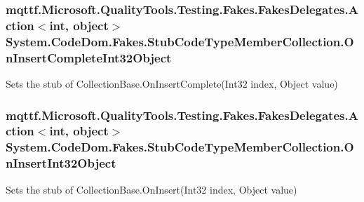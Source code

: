 \hypertarget{class_system_1_1_code_dom_1_1_fakes_1_1_stub_code_type_member_collection_a0ec7a85d0fcd5d9a91e2a6fa99c256ac}{
\subsubsection[{On\-Insert\-Complete\-Int32\-Object}]{\setlength{\rightskip}{0pt plus 5cm}mqttf.\-Microsoft.\-Quality\-Tools.\-Testing.\-Fakes.\-Fakes\-Delegates.\-Action$<$int, object$>$ System.\-Code\-Dom.\-Fakes.\-Stub\-Code\-Type\-Member\-Collection.\-On\-Insert\-Complete\-Int32\-Object}}\label{class_system_1_1_code_dom_1_1_fakes_1_1_stub_code_type_member_collection_a0ec7a85d0fcd5d9a91e2a6fa99c256ac}


Sets the stub of Collection\-Base.\-On\-Insert\-Complete(\-Int32 index, Object value)

\hypertarget{class_system_1_1_code_dom_1_1_fakes_1_1_stub_code_type_member_collection_a8614d203ec76fc0cc17ef7b7db53f347}{
\subsubsection[{On\-Insert\-Int32\-Object}]{\setlength{\rightskip}{0pt plus 5cm}mqttf.\-Microsoft.\-Quality\-Tools.\-Testing.\-Fakes.\-Fakes\-Delegates.\-Action$<$int, object$>$ System.\-Code\-Dom.\-Fakes.\-Stub\-Code\-Type\-Member\-Collection.\-On\-Insert\-Int32\-Object}}\label{class_system_1_1_code_dom_1_1_fakes_1_1_stub_code_type_member_collection_a8614d203ec76fc0cc17ef7b7db53f347}


Sets the stub of Collection\-Base.\-On\-Insert(\-Int32 index, Object value)


